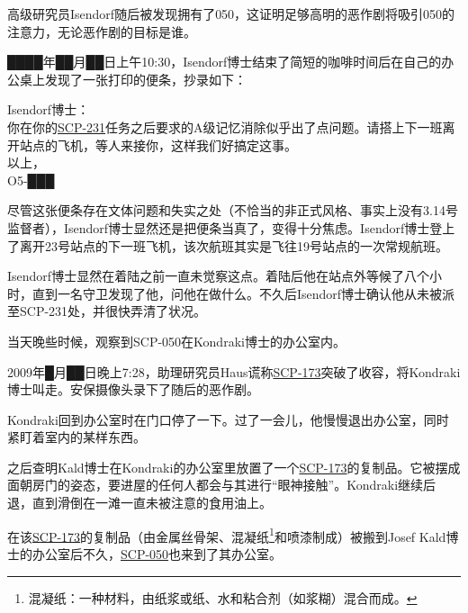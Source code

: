 高级研究员Isendorf随后被发现拥有了050，这证明足够高明的恶作剧将吸引050的注意力，无论恶作剧的目标是谁。



████年██月██日上午10:30，Isendorf博士结束了简短的咖啡时间后在自己的办公桌上发现了一张打印的便条，抄录如下：

\begin{scpbox}

Isendorf博士：\\
你在你的\hyperref[chap:SCP-231]{SCP-231}任务之后要求的A级记忆消除似乎出了点问题。请搭上下一班离开站点的飞机，等人来接你，这样我们好搞定这事。\\
以上，\\
O5-███

\end{scpbox}

尽管这张便条存在文体问题和失实之处（不恰当的非正式风格、事实上没有3.14号监督者），Isendorf博士显然还是把便条当真了，变得十分焦虑。Isendorf博士登上了离开23号站点的下一班飞机，该次航班其实是飞往19号站点的一次常规航班。

Isendorf博士显然在着陆之前一直未觉察这点。着陆后他在站点外等候了八个小时，直到一名守卫发现了他，问他在做什么。不久后Isendorf博士确认他从未被派至SCP-231处，并很快弄清了状况。

当天晚些时候，观察到SCP-050在Kondraki博士的办公室内。



2009年█月██日晚上7:28，助理研究员Haus谎称\hyperref[chap:SCP-173]{SCP-173}突破了收容，将Kondraki博士叫走。安保摄像头录下了随后的恶作剧。

Kondraki回到办公室时在门口停了一下。过了一会儿，他慢慢退出办公室，同时紧盯着室内的某样东西。

之后查明Kald博士在Kondraki的办公室里放置了一个\hyperref[chap:SCP-173]{SCP-173}的复制品。它被摆成面朝房门的姿态，要进屋的任何人都会与其进行“眼神接触”。Kondraki继续后退，直到滑倒在一滩一直未被注意的食用油上。

在该\hyperref[chap:SCP-173]{SCP-173}的复制品（由金属丝骨架、混凝纸\footnote{ 混凝纸：一种材料，由纸浆或纸、水和粘合剂（如浆糊）混合而成。}和喷漆制成）被搬到Josef Kald博士的办公室后不久，\hyperref[chap:SCP-050]{SCP-050}也来到了其办公室。



